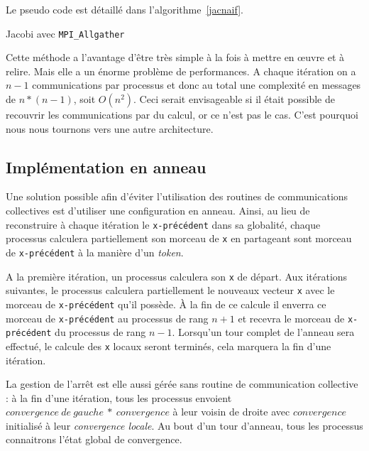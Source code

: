 \documentclass[a4paper]{article}
\begin{document}
Le pseudo code est détaillé dans l'algorithme~\ref{jacnaif}.

\begin{algorithm}[H]
 \SetLine %
 
 \caption{\label{jacnaif}Jacobi avec \texttt{MPI\_Allgather}}
\end{algorithm}


Cette méthode a l'avantage d'être très simple à la fois à mettre
en \oe uvre et à relire. Mais elle a un énorme problème de
performances. A chaque itération on a $n - 1$ communications par
processus et donc au total une complexité en messages de $n*(n - 1)$,
soit $O(n^2)$. Ceci serait envisageable si il était possible de
recouvrir les communications par du calcul, or ce n'est pas le
cas. C'est pourquoi nous nous tournons vers une autre architecture.

\subsection{Implémentation en anneau}
Une solution possible afin d'éviter l'utilisation des routines de communications 
collectives est d'utiliser une configuration en anneau. Ainsi, au lieu de
reconstruire à chaque itération le \texttt{x-précédent} dans sa globalité, 
chaque processus calculera partiellement son morceau de \texttt{x} en partageant 
sont morceau de \texttt{x-précédent} à la manière d'un \emph{token}. 

A la première itération, un processus calculera son \texttt{x} de départ. Aux
itérations suivantes, le processus calculera partiellement le nouveaux vecteur
\texttt{x} avec le morceau de \texttt{x-précédent} qu'il possède. À la fin de 
ce calcule il enverra ce morceau de \texttt{x-précédent} au processus de rang
$n + 1$ et recevra le morceau de \texttt{x-précédent} du processus de rang
$n - 1$. Lorsqu'un tour complet de l'anneau sera effectué, le calcule des 
\texttt{x} locaux seront terminés, cela marquera la fin d'une itération.

La gestion de l'arrêt est elle aussi gérée sans routine de communication 
collective : à la fin d'une itération, tous les processus envoient 
$convergence~de~gauche~*~convergence$ à leur voisin de droite avec $convergence$
initialisé à leur \emph{convergence locale}. Au bout d'un tour d'anneau, tous
les processus connaitrons l'état global de convergence.\\
\end{document}
